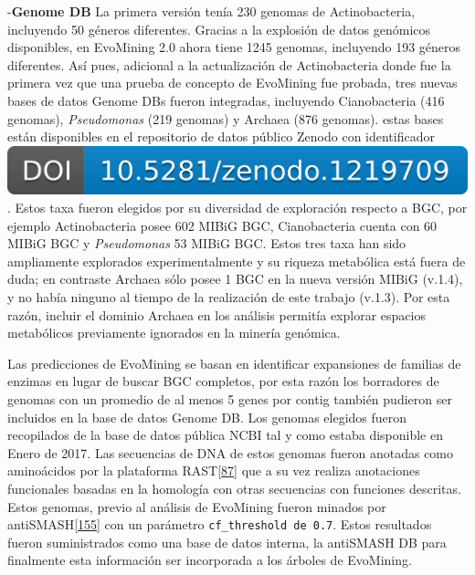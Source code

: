 \documentclass[12pt,twoside]{reedthesis}
\begin{document}
  -\textbf{Genome DB} La primera versión tenía 230 genomas de
  Actinobacteria, incluyendo 50 géneros diferentes. Gracias a la explosión
  de datos genómicos disponibles, en EvoMining 2.0 ahora tiene 1245
  genomas, incluyendo 193 géneros diferentes. Así pues, adicional a la
  actualización de Actinobacteria donde fue la primera vez que una prueba
  de concepto de EvoMining fue probada, tres nuevas bases de datos Genome
  DBs fueron integradas, incluyendo Cianobacteria (416 genomas),
  \emph{Pseudomonas} (219 genomas) y Archaea (876 genomas). estas bases
  están disponibles en el repositorio de datos público Zenodo con
  identificador
  \href{https://doi.org/10.5281/zenodo.1219709}{\includegraphics{chapter2/zenodo_1219709.png}}.
  Estos taxa fueron elegidos por su diversidad de exploración respecto a
  BGC, por ejemplo Actinobacteria posee 602 MIBiG BGC, Cianobacteria
  cuenta con 60 MIBiG BGC y \emph{Pseudomonas} 53 MIBiG BGC. Estos tres
  taxa han sido ampliamente explorados experimentalmente y su riqueza
  metabólica está fuera de duda; en contraste Archaea sólo posee 1 BGC en
  la nueva versión MIBiG (v.1.4), y no había ninguno al tiempo de la
  realización de este trabajo (v.1.3). Por esta razón, incluir el dominio
  Archaea en los análisis permitía explorar espacios metabólicos
  previamente ignorados en la minería genómica.
  
  Las predicciones de EvoMining se basan en identificar expansiones de
  familias de enzimas en lugar de buscar BGC completos, por esta razón los
  borradores de genomas con un promedio de al menos 5 genes por contig
  también pudieron ser incluidos en la base de datos Genome DB. Los
  genomas elegidos fueron recopilados de la base de datos pública NCBI tal
  y como estaba disponible en Enero de 2017. Las secuencias de DNA de
  estos genomas fueron anotadas como aminoácidos por la plataforma
  RAST{[}\protect\hyperlink{ref-overbeek_seed_2014}{87}{]} que a su vez
  realiza anotaciones funcionales basadas en la homología con otras
  secuencias con funciones descritas. Estos genomas, previo al análisis de
  EvoMining fueron minados por
  antiSMASH{[}\protect\hyperlink{ref-weber_antismash3_2015}{155}{]} con un
  parámetro \texttt{cf\_threshold\ de\ 0.7}. Estos resultados fueron
  suministrados como una base de datos interna, la antiSMASH DB para
  finalmente esta información ser incorporada a los árboles de EvoMining.
  
\end{document}

